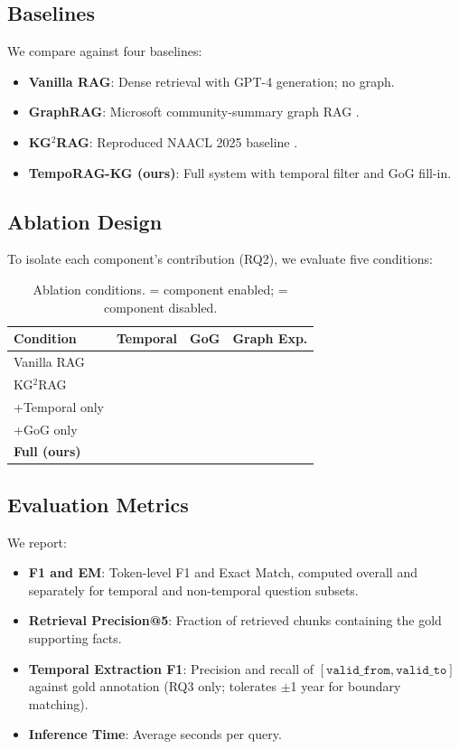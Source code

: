 \documentclass[11pt]{article}
\newcommand{\cmark}{\ding{51}}%
\newcommand{\xmark}{\ding{55}}%
\begin{document}
\subsection{Baselines}

We compare against four baselines:
\begin{itemize}
  \item \textbf{Vanilla RAG}: Dense retrieval with GPT-4 generation; no graph.
  \item \textbf{GraphRAG}: Microsoft community-summary graph RAG \cite{edge2024graphrag}.
  \item \textbf{KG$^2$RAG}: Reproduced NAACL 2025 baseline \cite{zhu2025kg2rag}.
  \item \textbf{TempoRAG-KG (ours)}: Full system with temporal filter and GoG fill-in.
\end{itemize}

\subsection{Ablation Design}

To isolate each component's contribution (RQ2), we evaluate five conditions:

\begin{table}[t]
  \centering
  \small
  \begin{tabular}{lccc}
    \toprule
    \textbf{Condition} & \textbf{Temporal} & \textbf{GoG} & \textbf{Graph Exp.} \\
    \midrule
    Vanilla RAG            & \xmark & \xmark & \xmark \\
    KG$^2$RAG              & \xmark & \xmark & \cmark \\
    +Temporal only         & \cmark & \xmark & \cmark \\
    +GoG only              & \xmark & \cmark & \cmark \\
    \textbf{Full (ours)}   & \cmark & \cmark & \cmark \\
    \bottomrule
  \end{tabular}
  \caption{Ablation conditions. \cmark = component enabled;
  \xmark = component disabled.}
  \label{tab:ablation}
\end{table}

\subsection{Evaluation Metrics}

We report:
\begin{itemize}
  \item \textbf{F1 and EM}: Token-level F1 and Exact Match, computed
    overall and separately for temporal and non-temporal question subsets.
  \item \textbf{Retrieval Precision@5}: Fraction of retrieved chunks
    containing the gold supporting facts.
  \item \textbf{Temporal Extraction F1}: Precision and recall of
    $[\mathtt{valid\_from}, \mathtt{valid\_to}]$ against gold annotation
    (RQ3 only; tolerates $\pm$1 year for boundary matching).
  \item \textbf{Inference Time}: Average seconds per query.
\end{itemize}
\end{document}
